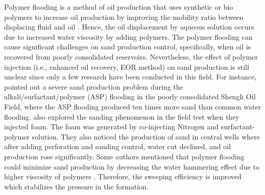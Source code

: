 \documentclass{article}
\begin{document}
Polymer flooding is a method of oil production that uses synthetic or bio polymers to increase oil production by improving the mobility ratio between displacing fluid and oil \citep{mandal2015chemical}. Hence, the oil displacement by aqueous solution occurs due to increased water viscosity by adding polymers. The polymer flooding can cause significant challenges on sand production control, specifically, when oil is recovered from poorly consolidated reservoirs. Nevertheless, the effect of polymer injection (i.e., enhanced oil recovery, EOR method) on sand production is still unclear since only a few research have been conducted in this field. For instance, \cite{guo2019lessons} pointed out a severe sand production problem during the alkali/surfactant/polymer (ASP) flooding in the poorly consolidated Shengli Oil Field, where the ASP flooding produced ten times more sand than common water flooding. \cite{li2005comparison} also explored the sanding phenomenon in the field test when they injected foam. The foam was generated by co-injecting Nitrogen and surfactant-polymer solution. They also noticed the production of sand in central wells where after adding perforation and sanding control, water cut declined, and oil production rose significantly. Some authors mentioned that polymer flooding could minimize sand production by decreasing the water hammering effect due to higher viscosity of polymers \citep{bautista2017state}. Therefore, the sweeping efficiency is improved which stabilizes the pressure in the formation. 
\end{document}
